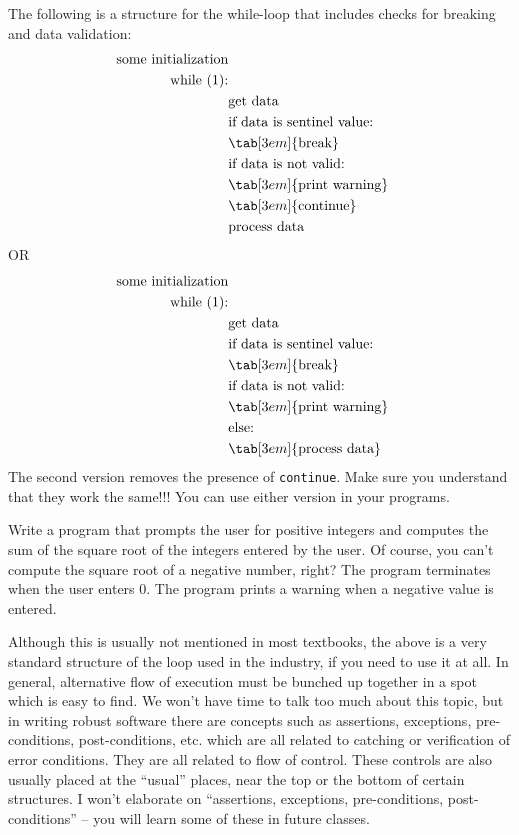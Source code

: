 The following is a structure for the while-loop that includes checks for
breaking and data validation:
\begin{align*}
\text{some initialization}\\
\text{while (1):}\\
&\text{get data}\\
&\text{if data is sentinel value:}\\
&\tab[3em]{\text{break}}\\
&\text{if data is not valid:}\\
&\tab[3em]{\text{print warning}}\\
&\tab[3em]{\text{continue}}\\
&\text{process data}\\
\end{align*}
OR
\begin{align*}
\text{some initialization}\\
\text{while (1):}\\
&\text{get data}\\
&\text{if data is sentinel value:}\\
&\tab[3em]{\text{break}}\\
&\text{if data is not valid:}\\
&\tab[3em]{\text{print warning}}\\
&\text{else:}\\
&\tab[3em]{\text{process data}}\\
\end{align*}
The second version removes the presence of \texttt{continue}. Make sure
you understand that they work the same!!! You can use either version in
your programs.

\begin{ex} Write a program that prompts the user for positive
integers and computes the sum of the square root of the integers entered
by the user. Of course, you can't compute the square
root of a negative number, right? The program terminates when the user
enters 0. The program prints a warning when a negative value is entered.
\end{ex}

Although this is usually not mentioned in most textbooks, the above is a
very standard structure of the loop used in the industry, if you need to
use it at all. In general, alternative flow of execution must be bunched
up together in a spot which is easy to find. We won't
have time to talk too much about this topic, but in writing robust
software there are concepts such as assertions, exceptions,
pre-conditions, post-conditions, etc. which are all related to catching
or verification of error conditions. They are all related to flow of
control. These controls are also usually placed at the ``usual'' places,
near the top or the bottom of certain structures. I
won't elaborate on ``assertions, exceptions,
pre-conditions, post-conditions'' -- you will learn some of these in
future classes.

